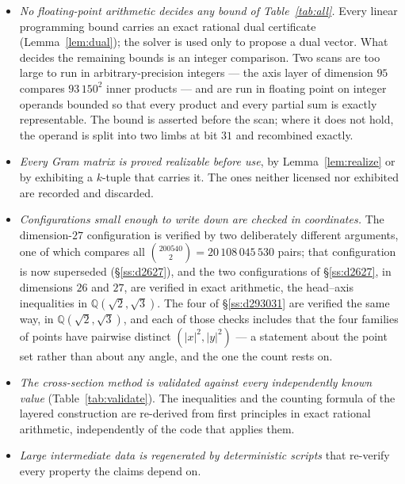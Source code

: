 \documentclass[11pt]{amsart}
\theoremstyle{remark}
\begin{document}
\begin{itemize}
\item \emph{No floating-point arithmetic decides any bound of
      Table~\ref{tab:all}.} Every linear programming bound carries an exact
      rational dual certificate (Lemma~\ref{lem:dual}); the solver is used only
      to propose a dual vector. What decides the remaining bounds is an integer
      comparison. Two scans are too large to run in arbitrary-precision
      integers --- the axis layer of dimension $95$ compares $93\,150^2$ inner
      products --- and are run in floating point on integer operands bounded so
      that every product and every partial sum is exactly representable. The
      bound is asserted before the scan; where it does not hold, the operand is
      split into two limbs at bit $31$ and recombined exactly.
\item \emph{Every Gram matrix is proved realizable before use}, by
      Lemma~\ref{lem:realize} or by exhibiting a $k$-tuple that carries it. The
      ones neither licensed nor exhibited are recorded and discarded.
\item \emph{Configurations small enough to write down are checked in
      coordinates.} The dimension-$27$ configuration is verified by two
      deliberately different arguments, one of which compares all
      $\binom{200540}{2}=20\,108\,045\,530$ pairs; that configuration is now
      superseded (\S\ref{ss:d2627}), and the two configurations of \S\ref{ss:d2627},
      in dimensions $26$ and $27$, are verified in exact arithmetic, the
      head--axis inequalities in $\mathbb{Q}(\sqrt2,\sqrt3)$. The four of
      \S\ref{ss:d293031} are verified the same way, in
      $\mathbb{Q}(\sqrt2,\sqrt3)$, and each of those checks includes that
      the four families of points have pairwise distinct
      $(|x|^{2},|y|^{2})$ --- a statement about the point set rather than about
      any angle, and the one the count rests on.
\item \emph{The cross-section method is validated against every independently
      known value} (Table~\ref{tab:validate}). The inequalities and the counting
      formula of the layered construction are re-derived from first principles
      in exact rational arithmetic, independently of the code that applies them.
\item \emph{Large intermediate data is regenerated by deterministic scripts}
      that re-verify every property the claims depend on.
\end{itemize}
\end{document}
